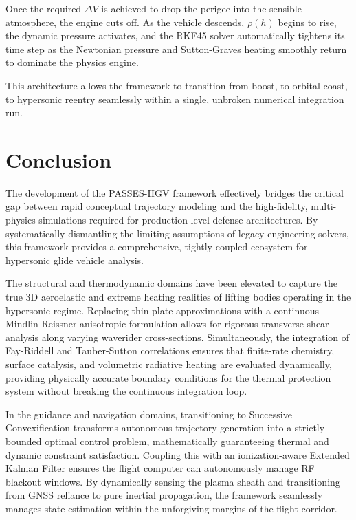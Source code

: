 \documentclass[11pt,a4paper]{article}
\theoremstyle{definition}
\numberwithin{equation}{section}
\begin{document}
Once the required $\Delta V$ is achieved to drop the perigee into the sensible atmosphere, the engine cuts off. As the vehicle descends, $\rho(h)$ begins to rise, the dynamic pressure activates, and the RKF45 solver automatically tightens its time step as the Newtonian pressure and Sutton-Graves heating smoothly return to dominate the physics engine.

This architecture allows the framework to transition from boost, to orbital coast, to hypersonic reentry seamlessly within a single, unbroken numerical integration run.

\section{Conclusion}
\label{sec:conclusion}
The development of the PASSES-HGV framework effectively bridges the critical gap between rapid conceptual trajectory modeling and the high-fidelity, multi-physics simulations required for production-level defense architectures. By systematically dismantling the limiting assumptions of legacy engineering solvers, this framework provides a comprehensive, tightly coupled ecosystem for hypersonic glide vehicle analysis.

The structural and thermodynamic domains have been elevated to capture the true 3D aeroelastic and extreme heating realities of lifting bodies operating in the hypersonic regime. Replacing thin-plate approximations with a continuous Mindlin-Reissner anisotropic formulation allows for rigorous transverse shear analysis along varying waverider cross-sections. Simultaneously, the integration of Fay-Riddell and Tauber-Sutton correlations ensures that finite-rate chemistry, surface catalysis, and volumetric radiative heating are evaluated dynamically, providing physically accurate boundary conditions for the thermal protection system without breaking the continuous integration loop.

In the guidance and navigation domains, transitioning to Successive Convexification transforms autonomous trajectory generation into a strictly bounded optimal control problem, mathematically guaranteeing thermal and dynamic constraint satisfaction. Coupling this with an ionization-aware Extended Kalman Filter ensures the flight computer can autonomously manage RF blackout windows. By dynamically sensing the plasma sheath and transitioning from GNSS reliance to pure inertial propagation, the framework seamlessly manages state estimation within the unforgiving margins of the flight corridor.
\end{document}
